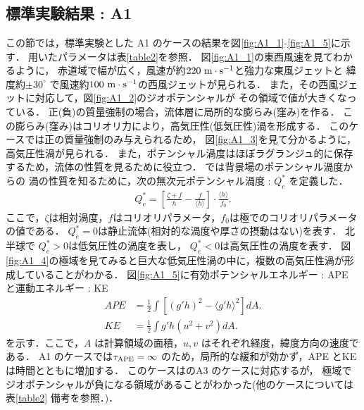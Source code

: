 \documentclass[a4j,12pt,openbib,oneside]{jreport}
\begin{document}
\chapter{}
\label{chap:3}
%
\section{標準実験結果 : A1}
\label{sec:A1}
この節では，標準実験とした A1 のケースの結果を図\ref{fig:A1_1}-\ref{fig:A1_5}に示す．
用いたパラメータは表\ref{table2}を参照．
図\ref{fig:A1_1}の東西風速を見てわかるように，
赤道域で幅が広く，風速が約$220 \rm{~m \cdot s^{-1}}$と強力な東風ジェットと
緯度約$\pm 30^\circ$ で風速約$100 \rm{~m \cdot s^{-1}}$の西風ジェットが見られる．
%
また，その西風ジェットに対応して，図\ref{fig:A1_2}のジオポテンシャルが
その領域で値が大きくなっている．
%
正(負)の質量強制の場合，流体層に局所的な膨らみ(窪み)を作る．
この膨らみ(窪み)はコリオリ力により，高気圧性(低気圧性)渦を形成する．
%
このケースでは正の質量強制のみ与えられるため，
図\ref{fig:A1_3}を見て分かるように，
高気圧性渦が見られる．
%
また，ポテンシャル渦度はほぼラグランジュ的に保存するため，流体の性質を見るために役立つ．
\cite{Brueshaber2019} では背景場のポテンシャル渦度からの
渦の性質を知るために，次の無次元ポテンシャル渦度 : $Q_e^*$ を定義した．
\begin{align}
Q_e^* = \left [\frac{\zeta+f}{h}-\frac{f}{\langle h \rangle}\right]\cdot \frac{\langle h \rangle}{f_0}. \label{eq:nonqv}
\end{align}
ここで，$\zeta$は相対渦度，$f$はコリオリパラメータ，$f_0$は極でのコリオリパラメータの値である．
%
$Q_e^*=0$は静止流体(相対的な渦度や厚さの摂動はない)を表す．
北半球で $Q_e^*>0$は低気圧性の渦度を表し，
$Q_e^*<0$は高気圧性の渦度を表す．
%
図\ref{fig:A1_4}の極域を見てみると巨大な低気圧性渦の中に，複数の高気圧性渦が形成していることがわかる．
%
図\ref{fig:A1_5}に有効ポテンシャルエネルギー : APE と運動エネルギー : KE 
\begin{align}
APE &= \frac{1}{2} \int \left[(g'h)^2 - \langle g'h \rangle^2   \right] dA. \label{eq:APE} \\
KE  &= \frac{1}{2} \int g'h(u^2 + v^2) dA. \label{eq:KE}
\end{align}
を示す．ここで，$A$ は計算領域の面積，$u, v$ はそれぞれ経度，緯度方向の速度である．
%
A1 のケースでは$\tau_{{\rm{APE}}} = \infty$ のため，局所的な緩和が効かず，APE とKE は時間とともに増加する．
このケースは\cite{Showman2007}のA3 のケースに対応するが，
極域でジオポテンシャルが負になる領域があることがわかった(他のケースについては表\ref{table2} 備考を参照．)．
\end{document}
